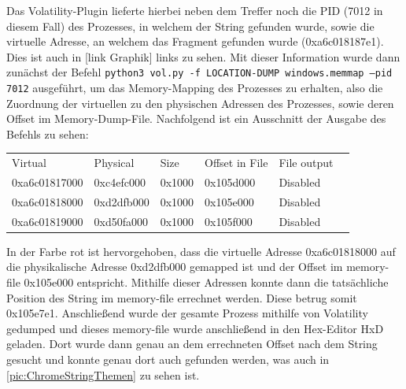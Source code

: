 Das Volatility-Plugin lieferte hierbei neben dem Treffer noch die PID (7012 in diesem Fall) des Prozesses, in welchem der String gefunden wurde, sowie die virtuelle Adresse, an welchem das Fragment gefunden wurde (0xa6c018187e1). Dies ist auch in [link Graphik] links zu sehen. Mit dieser Information wurde dann zunächst der Befehl \texttt{python3 vol.py -f LOCATION-DUMP windows.memmap --pid 7012} ausgeführt, um das Memory-Mapping des Prozesses zu erhalten, also die Zuordnung der virtuellen zu den physischen Adressen des Prozesses, sowie deren Offset im Memory-Dump-File. Nachfolgend ist ein Ausschnitt der Ausgabe des Befehls zu sehen:

\begin{table}[h!]
	\centering
	\begin{tabular}{llllll}
		Virtual                              & Physical                          & Size                          & Offset in File                   & File output                     &  \\
		0xa6c01817000                        & 0xc4efc000                        & 0x1000                        & 0x105d000                        & Disabled                        &  \\
		{\color[HTML]{FE0000} 0xa6c01818000} & {\color[HTML]{FE0000} 0xd2dfb000} & {\color[HTML]{FE0000} 0x1000} & {\color[HTML]{FE0000} 0x105e000} & {\color[HTML]{FE0000} Disabled} &  \\
		0xa6c01819000                        & 0xd50fa000                        & 0x1000                        & 0x105f000                        & Disabled                        & 
	\end{tabular}
\end{table}

In der Farbe rot ist hervorgehoben, dass die virtuelle Adresse 0xa6c01818000 auf die physikalische Adresse 0xd2dfb000 gemapped ist und der Offset im memory-file 0x105e000 entspricht. Mithilfe dieser Adressen konnte dann die tatsächliche Position des String im memory-file errechnet werden. Diese betrug somit 0x105e7e1. Anschließend wurde der gesamte Prozess mithilfe von Volatility gedumped und dieses memory-file wurde anschließend in den Hex-Editor HxD geladen. Dort wurde dann genau an dem errechneten Offset nach dem String gesucht und konnte genau dort auch gefunden werden, was auch in \autoref{pic:ChromeStringThemen} zu sehen ist.

